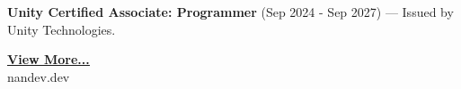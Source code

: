 \documentclass[11pt,a4paper]{article}
\begin{document}
\begin{minipage}[t]{18cm}
\begin{minipage}[t]{17cm}
\vspace{0.2cm}

\textbf{Unity Certified Associate: Programmer} (Sep 2024 - Sep 2027) --- Issued by Unity Technologies.

\end{minipage}

\vspace{0.8cm}

\begin{center}
\href{https://nandev.dev}{\bfseries\color{accent}\underline{View More...}}\\[4pt]
{\small nandev.dev}
\end{center}

\end{minipage}
\end{document}
